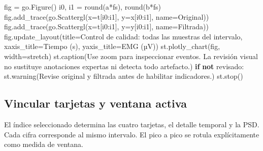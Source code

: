 \documentclass[
  spanish,
  10.5pt,
  a4paper,
  DIV=11,
  numbers=noendperiod]{scrartcl}
\newenvironment{Shaded}{\begin{snugshade}}{\end{snugshade}}
\newcommand{\BuiltInTok}[1]{\textcolor[rgb]{0.00,0.23,0.31}{#1}}
\newcommand{\ControlFlowTok}[1]{\textcolor[rgb]{0.00,0.23,0.31}{\textbf{#1}}}
\newcommand{\KeywordTok}[1]{\textcolor[rgb]{0.00,0.23,0.31}{\textbf{#1}}}
\newcommand{\NormalTok}[1]{\textcolor[rgb]{0.00,0.23,0.31}{#1}}
\newcommand{\OperatorTok}[1]{\textcolor[rgb]{0.37,0.37,0.37}{#1}}
\newcommand{\StringTok}[1]{\textcolor[rgb]{0.13,0.47,0.30}{#1}}
\begin{document}
\begin{Shaded}
\begin{Highlighting}[]
\NormalTok{fig }\OperatorTok{=}\NormalTok{ go.Figure()}
\NormalTok{i0, i1 }\OperatorTok{=} \BuiltInTok{round}\NormalTok{(a}\OperatorTok{*}\NormalTok{fs), }\BuiltInTok{round}\NormalTok{(b}\OperatorTok{*}\NormalTok{fs)}
\NormalTok{fig.add\_trace(go.Scattergl(x}\OperatorTok{=}\NormalTok{t[i0:i1], y}\OperatorTok{=}\NormalTok{x[i0:i1], name}\OperatorTok{=}\StringTok{\textquotesingle{}Original\textquotesingle{}}\NormalTok{))}
\NormalTok{fig.add\_trace(go.Scattergl(x}\OperatorTok{=}\NormalTok{t[i0:i1], y}\OperatorTok{=}\NormalTok{y[i0:i1], name}\OperatorTok{=}\StringTok{\textquotesingle{}Filtrada\textquotesingle{}}\NormalTok{))}
\NormalTok{fig.update\_layout(title}\OperatorTok{=}\StringTok{\textquotesingle{}Control de calidad: todas las muestras del intervalo\textquotesingle{}}\NormalTok{,}
\NormalTok{                  xaxis\_title}\OperatorTok{=}\StringTok{\textquotesingle{}Tiempo (s)\textquotesingle{}}\NormalTok{, yaxis\_title}\OperatorTok{=}\StringTok{\textquotesingle{}EMG (µV)\textquotesingle{}}\NormalTok{)}
\NormalTok{st.plotly\_chart(fig, width}\OperatorTok{=}\StringTok{\textquotesingle{}stretch\textquotesingle{}}\NormalTok{)}
\NormalTok{st.caption(}\StringTok{\textquotesingle{}Use zoom para inspeccionar eventos. La revisión visual \textquotesingle{}}
           \StringTok{\textquotesingle{}no sustituye anotaciones expertas ni detecta todo artefacto.\textquotesingle{}}\NormalTok{)}
\ControlFlowTok{if} \KeywordTok{not}\NormalTok{ revisado:}
\NormalTok{    st.warning(}\StringTok{\textquotesingle{}Revise original y filtrada antes de habilitar indicadores.\textquotesingle{}}\NormalTok{)}
\NormalTok{    st.stop()}
\end{Highlighting}
\end{Shaded}

\subsection{Vincular tarjetas y ventana
activa}\label{vincular-tarjetas-y-ventana-activa}

El índice seleccionado determina las cuatro tarjetas, el detalle
temporal y la PSD. Cada cifra corresponde al mismo intervalo. El pico a
pico se rotula explícitamente como medida de ventana.
\end{document}
